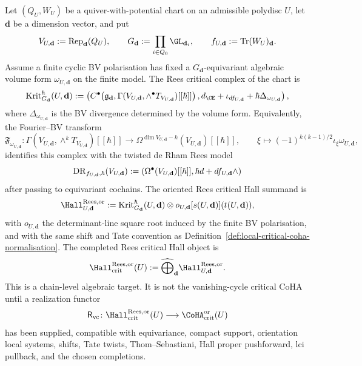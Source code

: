 \begin{definition}
\label{def:rees-critical-hall-interlayer}
Let $(Q_U,W_U)$ be a quiver-with-potential chart on an admissible
polydisc $U$, let $\mathbf d$ be a dimension vector, and put
\[
 V_{U,\mathbf d}:=\mathrm{Rep}_{\mathbf d}(Q_U),
 \qquad
 G_{\mathbf d}:=\prod_{i\in Q_0}\GL_{\mathbf d_i},
 \qquad
 f_{U,\mathbf d}:=\mathrm{Tr}(W_U)_{\mathbf d}.
\]
Assume a finite cyclic BV polarisation has fixed a
$G_{\mathbf d}$-equivariant algebraic volume form
$\omega_{U,\mathbf d}$ on the finite model. The Rees critical complex of
the chart is
\[
 \Krit^{\hbar}_{G_{\mathbf d}}(U,\mathbf d)
 :=
 \left(
 C^\bullet\!\left(
 \mathfrak g_{\mathbf d},
 \Gamma(V_{U,\mathbf d},\wedge^\bullet T_{V_{U,\mathbf d}})[[\hbar]]
 \right),
 d_{\CE}+\iota_{df_{U,\mathbf d}}+\hbar\Delta_{\omega_{U,\mathbf d}}
 \right),
\]
where $\Delta_{\omega_{U,\mathbf d}}$ is the BV divergence determined by
the volume form. Equivalently, the Fourier--BV transform
\[
 \mathfrak F_{\omega_{U,\mathbf d}}\colon
 \Gamma(V_{U,\mathbf d},\wedge^kT_{V_{U,\mathbf d}})[[\hbar]]
 \longrightarrow
 \Omega^{\dim V_{U,\mathbf d}-k}(V_{U,\mathbf d})[[\hbar]],
 \qquad
 \xi\longmapsto
 (-1)^{k(k-1)/2}\iota_\xi\omega_{U,\mathbf d},
\]
identifies this complex with the twisted de Rham Rees model
\[
 \mathrm{DR}_{f_{U,\mathbf d},\hbar}(V_{U,\mathbf d})
 :=
 \left(
 \Omega^\bullet(V_{U,\mathbf d})[[\hbar]],
 \hbar d+df_{U,\mathbf d}\wedge
 \right)
\]
after passing to equivariant cochains. The oriented Rees critical Hall
summand is
\[
 \Hall^{\mathrm{Rees},\mathrm{or}}_{U,\mathbf d}
 :=
 \Krit^{\hbar}_{G_{\mathbf d}}(U,\mathbf d)
 \otimes o_{U,\mathbf d}[s(U,\mathbf d)](t(U,\mathbf d)),
\]
with $o_{U,\mathbf d}$ the determinant-line square root induced by the
finite BV polarisation, and with the same shift and Tate convention as
Definition~\ref{def:local-critical-coha-normalisation}. The completed
Rees critical Hall object is
\[
 \Hall_{\mathrm{crit}}^{\mathrm{Rees},\mathrm{or}}(U)
 :=
 \widehat{\bigoplus}_{\mathbf d}
 \Hall^{\mathrm{Rees},\mathrm{or}}_{U,\mathbf d}.
\]
This is a chain-level algebraic target. It is not the
vanishing-cycle critical CoHA until a realization functor
\[
 \mathsf R_{\mathrm{vc}}\colon
 \Hall_{\mathrm{crit}}^{\mathrm{Rees},\mathrm{or}}(U)
 \longrightarrow
 \CoHA_{\mathrm{crit}}^{\mathrm{or}}(U)
\]
has been supplied, compatible with equivariance, compact support,
orientation local systems, shifts, Tate twists, Thom--Sebastiani, Hall
proper pushforward, lci pullback, and the chosen completions.
\end{definition}

